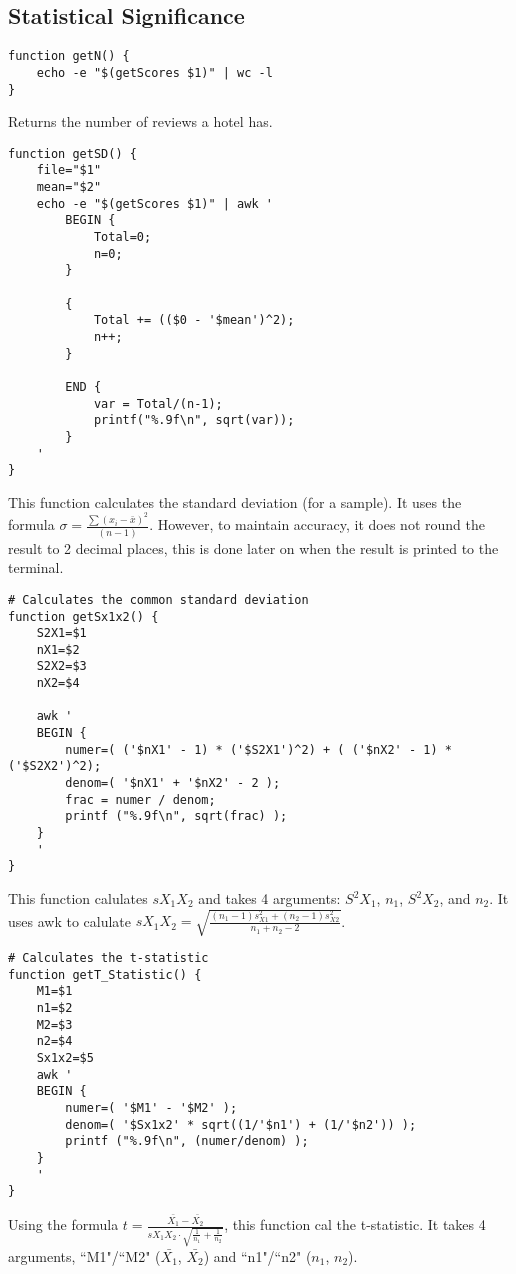 \documentclass[a4paper]{article}
\begin{document}
%
\newpage
\subsection{Statistical Significance}

\begin{lstlisting}
function getN() {
	echo -e "$(getScores $1)" | wc -l
}
\end{lstlisting}
Returns the number of reviews a hotel has.

\begin{lstlisting}
function getSD() {
	file="$1"
	mean="$2"
	echo -e "$(getScores $1)" | awk '
		BEGIN {
			Total=0;
			n=0;
		}

		{
			Total += (($0 - '$mean')^2);
			n++;
		}

		END {
			var = Total/(n-1);
			printf("%.9f\n", sqrt(var));
		}
	'
}
\end{lstlisting}
This function calculates the standard deviation (for a sample).
It uses the formula $\sigma = \frac{\sum{(x_i - \bar{x})^2}}{(n-1)}$.
However, to maintain accuracy, it does not round the result to 2 decimal places, this is done later on when the result is printed to the terminal.

\begin{lstlisting}
# Calculates the common standard deviation
function getSx1x2() {
	S2X1=$1
	nX1=$2
	S2X2=$3
	nX2=$4

	awk '
	BEGIN {
		numer=( ('$nX1' - 1) * ('$S2X1')^2) + ( ('$nX2' - 1) * ('$S2X2')^2);
		denom=( '$nX1' + '$nX2' - 2 );
		frac = numer / denom;
		printf ("%.9f\n", sqrt(frac) );
	}
	'
}
\end{lstlisting}
This function calulates $s X_1 X_2$ and takes 4 arguments: $S^2X_1$, $n_1$, $S^2X_2$, and  $n_2$.
It uses awk to calulate $s X_1 X_2 = \sqrt{\frac{(n_1 - 1)s^{2}_{X1} + (n_2 - 1)s^{2}_{X2}}{n_1 + n_2 - 2}}$.

\begin{lstlisting}
# Calculates the t-statistic
function getT_Statistic() {
	M1=$1
	n1=$2
	M2=$3
	n2=$4
	Sx1x2=$5
	awk '
	BEGIN {
		numer=( '$M1' - '$M2' );
		denom=( '$Sx1x2' * sqrt((1/'$n1') + (1/'$n2')) );
		printf ("%.9f\n", (numer/denom) );
	}
	'
}
\end{lstlisting}
Using the formula $t = \frac{\bar{X_1} - \bar{X_2}}{s X_1 X_2 \cdot \sqrt{\frac{1}{n_1} + \frac{1}{n_2}}}$, this function cal the t-statistic.
It takes 4 arguments, ``M1"/``M2" ($\bar{X_1}$, $\bar{X_2}$) and ``n1"/``n2" ($n_1$, $n_2$).
\end{document}
